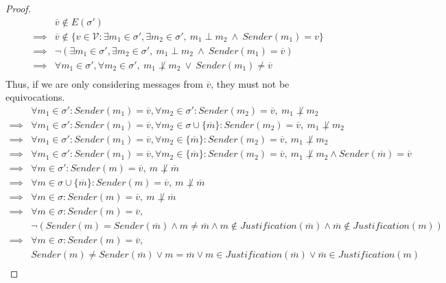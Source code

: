 \begin{proof}
\begin{align}
        &\overline{v} \notin E(\sigma') \\
\implies&\overline{v} \notin \{v \in \mathcal{V} : \exists m_1 \in \sigma', \exists m_2 \in \sigma', ~ m_1 \perp m_2 ~ \land ~ Sender(m_1) = v \} \\
\implies&\neg (\exists m_1 \in \sigma', \exists m_2 \in \sigma', ~ m_1 \perp m_2 ~ \land ~ Sender(m_1) = \overline{v}) \\
\implies&\forall m_1 \in \sigma', \forall m_2 \in \sigma', ~ m_1 \not\perp m_2 ~ \lor ~ Sender(m_1) \neq \overline{v} \\
\end{align}
Thus, if we are only considering messages from $\overline{v}$, they must not be equivocations.
\begin{align}
        &\forall m_1 \in \sigma': Sender(m_1) = \overline{v}, \forall m_2 \in \sigma': Sender(m_2) = \overline{v}, ~ m_1 \not\perp m_2 \\
\implies&\forall m_1 \in \sigma': Sender(m_1) = \overline{v}, \forall m_2 \in \sigma \cup \{\overline{m}\}: Sender(m_2) = \overline{v}, ~ m_1 \not\perp m_2 \\
\implies&\forall m_1 \in \sigma': Sender(m_1) = \overline{v}, \forall m_2 \in \{\overline{m}\}: Sender(m_2) = \overline{v}, ~ m_1 \not\perp m_2 \\
\implies&\forall m_1 \in \sigma': Sender(m_1) = \overline{v}, \forall m_2 \in \{\overline{m}\}: Sender(m_2) = \overline{v}, ~ m_1 \not\perp m_2 \land Sender(\overline{m}) = \overline{v}\\
\implies&\forall m \in \sigma': Sender(m) = \overline{v}, ~ m \not\perp \overline{m} \\
\implies&\forall m \in \sigma \cup \{\overline{m}\}: Sender(m) = \overline{v}, ~ m \not\perp \overline{m} \\
\implies&\forall m \in \sigma: Sender(m) = \overline{v}, ~ m \not\perp \overline{m} \\
\implies&\forall m \in \sigma: Sender(m) = \overline{v}, \\
        &\neg (Sender(m) = Sender(\overline{m}) \land m \neq \overline{m} \land m \notin Justification(\overline{m}) \land \overline{m} \notin Justification(m)) \\
\implies&\forall m \in \sigma: Sender(m) = \overline{v}, \\
        &Sender(m) \neq Sender(\overline{m}) \lor m = \overline{m} \lor m \in Justification(\overline{m}) \lor \overline{m} \in Justification(m) \\

\end{align}
\end{proof}
